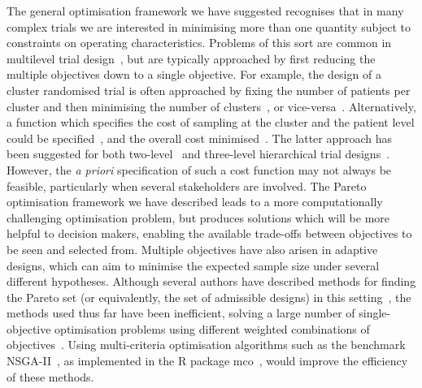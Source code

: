 \documentclass{article} %
\begin{document}
The general optimisation framework we have suggested recognises that in many complex trials we are interested in minimising more than one quantity subject to constraints on operating characteristics. Problems of this sort are common in multilevel trial design~\cite{Hemming2017}, but are typically approached by first reducing the multiple objectives down to a single objective. For example, the design of a cluster randomised trial is often approached by fixing the number of patients per cluster and then minimising the number of clusters~\cite{Donner2000}, or vice-versa~\cite{Hemming2011, Eldridge2015}. Alternatively, a function which specifies the cost of sampling at the cluster and the patient level could be specified~\cite[p. 175]{Hox2002}, and the overall cost minimised~\cite{Snijders1993}. The latter approach has been suggested for both two-level~\cite{Raudenbush2000} and three-level hierarchical trial designs~\cite{Breukelen2012, Teerenstra2008}. However, the \emph{a priori} specification of such a cost function may not always be feasible, particularly when several stakeholders are involved. The Pareto optimisation framework we have described leads to a more computationally challenging optimisation problem, but produces solutions which will be more helpful to decision makers, enabling the available trade-offs between objectives to be seen and selected from. Multiple objectives have also arisen in adaptive designs, which can aim to minimise the expected sample size under several different hypotheses. Although several authors have described methods for finding the Pareto set (or equivalently, the set of admissible designs) in this setting~\cite{Jung2001, Jung2004}, the methods used thus far have been inefficient, solving a large number of single-objective optimisation problems using different weighted combinations of objectives~\cite{Mander2012}. Using multi-criteria optimisation algorithms such as the benchmark NSGA-II~\cite{Deb2002}, as implemented in the R package mco~\cite{Mersmann2014}, would improve the efficiency of these methods.


\end{document}
